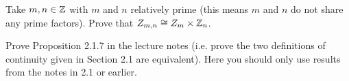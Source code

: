 \documentclass[12pt]{article}
\begin{document}
\begin{problem}{6}
Take $m,n\in \mathbb{Z}$ with $m$ and $n$ relatively prime (this means $m$ and $n$ do
not share any prime factors). Prove that $Z_{m,n}\cong Z_m\times\mathbb{Z}_n$.
\begin{solution}
\end{solution}
\end{problem}
\begin{problem}{7}
Prove Proposition 2.1.7 in the lecture notes (i.e. prove the two definitions of
continuity given in Section 2.1 are equivalent). Here you should only use
results from the notes in 2.1 or earlier.
\begin{solution}
\end{solution}
\end{problem}
\end{document}
